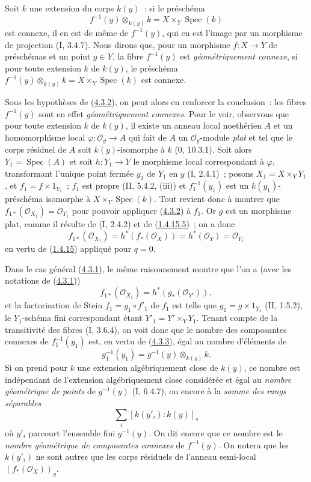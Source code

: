 \begin{remark}[4.3.4]
\label{III.4.3.4-fr}
Soit $k$ une extension du corps $k(y)$~: si le préschéma
\[
f^{-1}(y)\otimes_{k(y)}k=X\times_Y\operatorname{Spec}(k)
\]
est connexe, il en est de même de $f^{-1}(y)$, qui en est l'image par un
morphisme de projection (I, 3.4.7). Nous dirons que, pour un morphisme
$f:X\to Y$ de préschémas et un point $y\in Y$, la fibre $f^{-1}(y)$ est
\emph{géométriquement connexe}, si pour toute extension $k$ de $k(y)$, le
préschéma
$f^{-1}(y)\otimes_{k(y)}k=X\times_Y\operatorname{Spec}(k)$ est connexe.


Sous les hypothèses de (\hyperref[III.4.3.2-fr]{4.3.2}), on peut alors en
renforcer la conclusion~: les fibres $f^{-1}(y)$ sont en effet
\emph{géométriquement connexes}. Pour le voir, observons que pour toute
extension $k$ de $k(y)$, il existe un anneau local noethérien $A$ et un
homomorphisme local $\varphi:\mathcal O_y\to A$ qui fait de $A$ un
$\mathcal O_y$-module \emph{plat} et tel que le corps résiduel de $A$ soit
$k(y)$-isomorphe à $k$ (0, 10.3.1). Soit alors
$Y_1=\operatorname{Spec}(A)$ et soit $h:Y_1\to Y$ le morphisme local
correspondant à $\varphi$, transformant l'unique point fermée $y_1$ de $Y_1$
en $y$ (I, 2.4.1)~; posons
$X_1=X\times_YY_1$, et $f_1=f\times1_{Y_1}$~; $f_1$ est propre
(II, 5.4.2, (iii)) et $f_1^{-1}(y_1)$ est un $k(y_1)$-préschéma isomorphe à
$X\times_Y\operatorname{Spec}(k)$. Tout revient donc à montrer que
$f_{1*}(\mathcal O_{X_1})=\mathcal O_{Y_1}$ pour pouvoir appliquer
(\hyperref[III.4.3.2-fr]{4.3.2}) à $f_1$. Or $g$ est un morphisme plat,
comme il résulte de (I, 2.4.2) et de
(\hyperref[III.1.4.15-fr]{1.4.15.5})~; on a donc
\[
f_{1*}(\mathcal O_{X_1})
=h^*(f_*(\mathcal O_X))
=h^*(\mathcal O_Y)
=\mathcal O_{Y_1}
\]
en vertu de (\hyperref[III.1.4.15-fr]{1.4.15}) appliqué pour $q=0$.

Dans le cas général (\hyperref[III.4.3.1-fr]{4.3.1}), le même raisonnement
montre que l'on a (avec les notations de
(\hyperref[III.4.3.1-fr]{4.3.1}))
\[
f_{1*}(\mathcal O_{X_1})=h^*(g_*(\mathcal O_{Y'})),
\]
et la factorisation de Stein $f_1=g_1\circ f'_1$ de $f_1$ est telle que
$g_1=g\times1_{Y_1}$ (II, 1.5.2), le $Y_1$-schéma fini correspondant étant
$Y'_1=Y'\times_YY_1$. Tenant compte de la transitivité des fibres
(I, 3.6.4), on voit donc que le nombre des composantes connexes de
$f_1^{-1}(y_1)$ est, en vertu de
(\hyperref[III.4.3.3-fr]{4.3.3}), égal au nombre d'éléments de
\[
g_1^{-1}(y_1)=g^{-1}(y)\otimes_{k(y)}k.
\]
Si on prend pour $k$ une extension algébriquement close de $k(y)$, ce nombre
est indépendant de l'extension algébriquement close considérée et égal au
\emph{nombre géométrique de points} de $g^{-1}(y)$ (I, 6.4.7), ou encore à
la \emph{somme des rangs séparables}
\[
\sum_i[k(y'_i):k(y)]_s
\]
où $y'_i$ parcourt l'ensemble fini $g^{-1}(y)$. On dit encore que ce nombre
est le \emph{nombre géométrique de composantes connexes} de $f^{-1}(y)$. On
notera que les $k(y'_i)$ ne sont autres que les corps résiduels de l'anneau
semi-local $(f_*(\mathcal O_X))_y$.
\end{remark}

